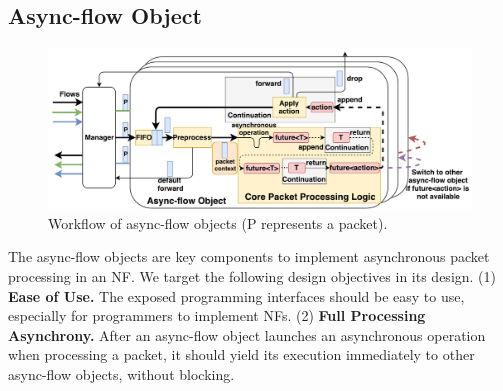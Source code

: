 
\subsection {Async-flow Object}
\label{sec:async-flow-object}

\begin{figure}[!h]
\centering
\includegraphics[width=\columnwidth]{chap-netstar/figure/async-flow-object.pdf}
\caption{Workflow of async-flow objects (P represents a packet).}
\label{fig:simulated_loop}
\end{figure}

The async-flow objects are key components to implement asynchronous packet processing in an NF. We target the following design objectives in its design.
(1) \textbf{Ease of Use.} The exposed programming interfaces should be easy to use, especially for programmers to implement NFs.
(2) \textbf{Full Processing Asynchrony.} %
After an async-flow object launches an asynchronous operation when processing a packet, it should yield its execution immediately to other async-flow objects, without blocking.


